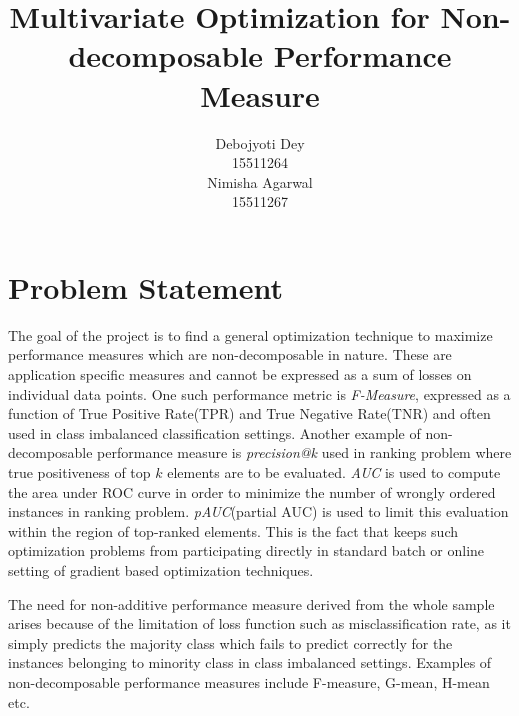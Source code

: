 \documentclass{article} %
\title{Multivariate Optimization for Non-decomposable Performance Measure}
\author{
Debojyoti Dey \\
15511264 \\
\And
Nimisha Agarwal \\
15511267 \\
}
\begin{document}
\maketitle

\section{Problem Statement}

The goal of the project is to find a general optimization technique to maximize performance measures which are non-decomposable in nature. These are application specific measures and cannot be expressed as a sum of losses on individual data points. One such performance metric is \textit{F-Measure}, expressed as a function of True Positive Rate(TPR) and True Negative Rate(TNR) and often used in class imbalanced classification settings. Another example of non-decomposable performance measure is \textit{precision@k} used in ranking problem where true positiveness of top $k$ elements are to be evaluated. \textit{AUC} is used to compute the area under ROC curve in order to minimize the number of wrongly ordered instances in ranking problem. \textit{pAUC}(partial AUC) is used to limit this evaluation within the region of top-ranked elements. This is the fact that keeps such optimization problems from participating directly in standard batch or online setting of gradient based optimization techniques.

The need for non-additive performance measure derived from the whole sample arises because of the limitation of loss function such as misclassification rate, as it simply predicts the majority class which fails to predict correctly for the instances belonging to minority class in class imbalanced settings. Examples of non-decomposable performance measures include F-measure, G-mean, H-mean etc.
\end{document}
